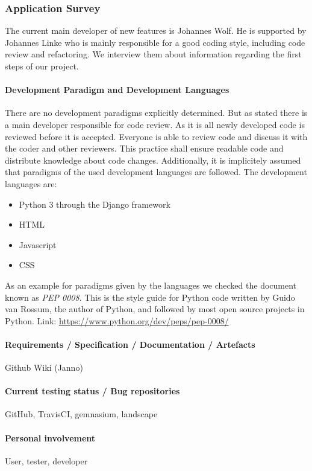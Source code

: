 \subsubsection{Application Survey}
The current main developer of new features is Johannes Wolf. 
He is supported by Johannes Linke who is mainly responsible for a good coding style, including code review and refactoring. 
We interview them about information regarding the first steps of our project.

\paragraph{Development Paradigm and Development Languages}
There are no development paradigms explicitly determined.
But as stated there is a main developer responsible for code review.
As it is all newly developed code is reviewed before it is accepted.
Everyone is able to review code and discuss it with the coder and other reviewers.
This practice shall ensure readable code and distribute knowledge about code changes.
Additionally, it is implicitely assumed that paradigms of the used development languages are followed.
The development languages are:
\begin{itemize}
    \item Python 3 through the Django framework
    \item HTML
    \item Javascript
    \item CSS
\end{itemize}
As an example for paradigms given by the languages we checked the document known as \emph{PEP 0008}.
This is the style guide for Python code written by Guido van Rossum, the author of Python, and followed by most open source projects in Python.
Link: \url{https://www.python.org/dev/peps/pep-0008/}

\paragraph{Requirements / Specification / Documentation / Artefacts}
Github Wiki
(Janno)

\paragraph{Current testing status / Bug repositories}

GitHub, TravisCI, gemnasium, landscape

\paragraph{Personal involvement}

User, tester, developer
